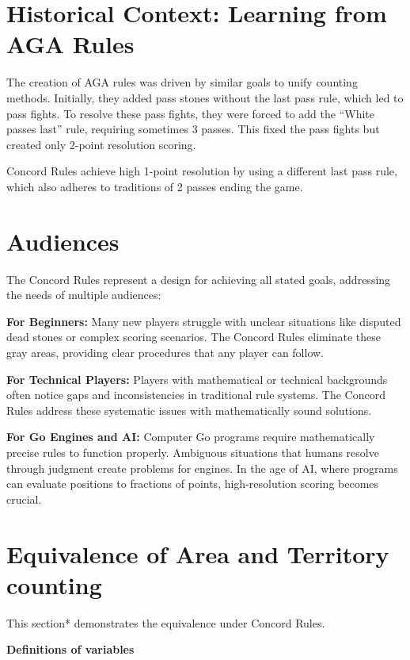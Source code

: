 \documentclass[11pt]{article}
\begin{document}
\newpage
\section*{Historical Context: Learning from AGA Rules}

The creation of AGA rules was driven by similar goals to unify counting methods.
Initially, they added pass stones without the last pass rule, which led to pass fights.
To resolve these pass fights, they were forced to add the ``White passes last'' rule, requiring sometimes 3 passes.
This fixed the pass fights but created only 2-point resolution scoring.

Concord Rules achieve high 1-point resolution by using a different last pass rule, which also adheres to traditions of 2 passes ending the game.

\section*{Audiences}

The Concord Rules represent a design for achieving all stated goals, addressing the needs of multiple audiences:

\textbf{For Beginners:} Many new players struggle with unclear situations like disputed dead stones or complex scoring scenarios.
The Concord Rules eliminate these gray areas, providing clear procedures that any player can follow.

\textbf{For Technical Players:} Players with mathematical or technical backgrounds often notice gaps and inconsistencies in traditional rule systems.
The Concord Rules address these systematic issues with mathematically sound solutions.

\textbf{For Go Engines and AI:} Computer Go programs require mathematically precise rules to function properly.
Ambiguous situations that humans resolve through judgment create problems for engines.
In the age of AI, where programs can evaluate positions to fractions of points, high-resolution scoring becomes crucial.


\newpage
\section*{Equivalence of Area and Territory counting}

This section* demonstrates the equivalence under Concord Rules.

\textbf{Definitions of variables}
\end{document}
